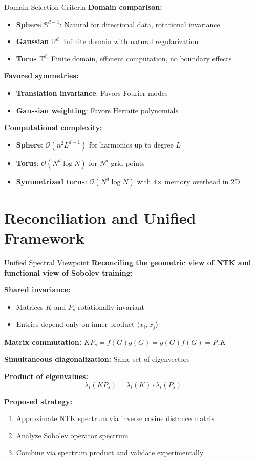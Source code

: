 \documentclass{beamer}
\begin{document}
\begin{frame}{Domain Selection Criteria}
\textbf{Domain comparison:}

\begin{itemize}
\item \textbf{Sphere $\mathbb{S}^{d-1}$}: Natural for directional data, rotational invariance
\item \textbf{Gaussian $\mathbb{R}^d$}: Infinite domain with natural regularization
\item \textbf{Torus $\mathbb{T}^d$}: Finite domain, efficient computation, no boundary effects
\end{itemize}

\textbf{Favored symmetries:}
\begin{itemize}
\item \textbf{Translation invariance}: Favors Fourier modes
\item \textbf{Gaussian weighting}: Favors Hermite polynomials
\end{itemize}

\textbf{Computational complexity:}
\begin{itemize}
\item \textbf{Sphere}: $\mathcal{O}(n^2 L^{d-1})$ for harmonics up to degree $L$
\item \textbf{Torus}: $\mathcal{O}(N^d \log N)$ for $N^d$ grid points
\item \textbf{Symmetrized torus}: $\mathcal{O}(N^d \log N)$ with 4× memory overhead in 2D
\end{itemize}
\end{frame}

\section{Reconciliation and Unified Framework}

\begin{frame}{Unified Spectral Viewpoint}
\textbf{Reconciling the geometric view of NTK and functional view of Sobolev training:}

\textbf{Shared invariance:}
\begin{itemize}
\item Matrices $K$ and $P_s$ rotationally invariant
\item Entries depend only on inner product $\langle x_i, x_j \rangle$
\end{itemize}

\textbf{Matrix commutation:} $K P_s = f(G)g(G) = g(G)f(G) = P_s K$

\textbf{Simultaneous diagonalization:} Same set of eigenvectors

\textbf{Product of eigenvalues:}
\[ \lambda_i(K P_s) = \lambda_i(K) \cdot \lambda_i(P_s) \]

\textbf{Proposed strategy:}
\begin{enumerate}
\item Approximate NTK spectrum via inverse cosine distance matrix
\item Analyze Sobolev operator spectrum
\item Combine via spectrum product and validate experimentally
\end{enumerate}
\end{frame}
\end{document}
